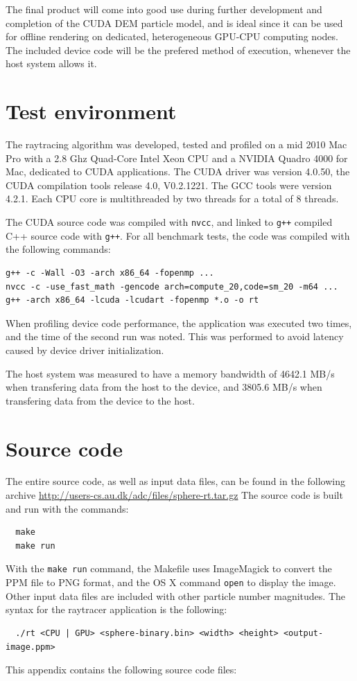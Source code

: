 \documentclass[journal]{IEEEtran}
\begin{document}
The final product will come into good use during further development and completion of the CUDA DEM particle model, and is ideal since it can be used for offline rendering on dedicated, heterogeneous GPU-CPU computing nodes. The included device code will be the prefered method of execution, whenever the host system allows it.






\appendices

\section{Test environment}
The raytracing algorithm was developed, tested and profiled on a mid 2010 Mac Pro with a \num{2.8} Ghz Quad-Core Intel Xeon CPU and a NVIDIA Quadro 4000 for Mac, dedicated to CUDA applications. The CUDA driver was version 4.0.50, the CUDA compilation tools release 4.0, V0.2.1221. The GCC tools were version 4.2.1. Each CPU core is multithreaded by two threads for a total of 8 threads.

The CUDA source code was compiled with \texttt{nvcc}, and linked to \texttt{g++} compiled C++ source code with \texttt{g++}. For all benchmark tests, the code was compiled with the following commands:
\begin{lstlisting}
g++ -c -Wall -O3 -arch x86_64 -fopenmp ... 
nvcc -c -use_fast_math -gencode arch=compute_20,code=sm_20 -m64 ...
g++ -arch x86_64 -lcuda -lcudart -fopenmp *.o -o rt
\end{lstlisting}
When profiling device code performance, the application was executed two times, and the time of the second run was noted. This was performed to avoid latency caused by device driver initialization.

The host system was measured to have a memory bandwidth of 4642.1 MB/s when transfering data from the host to the device, and 3805.6 MB/s when transfering data from the device to the host.

\ifCLASSOPTIONcaptionsoff
  \newpage
\fi


\section{Source code}
The entire source code, as well as input data files, can be found in the following archive
\url{http://users-cs.au.dk/adc/files/sphere-rt.tar.gz}
The source code is built and run with the commands:
\begin{lstlisting}
  make
  make run
\end{lstlisting}
With the \texttt{make run} command, the Makefile uses ImageMagick to convert the PPM file to PNG format, and the OS X command \texttt{open} to display the image. Other input data files are included with other particle number magnitudes. The syntax for the raytracer application is the following:
\begin{lstlisting}
  ./rt <CPU | GPU> <sphere-binary.bin> <width> <height> <output-image.ppm>
\end{lstlisting}
This appendix contains the following source code files:
\lstlistoflistings
\end{document}
